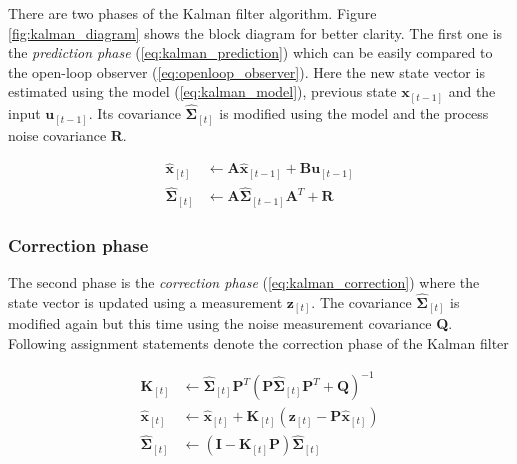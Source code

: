 There are two phases of the Kalman filter algorithm. Figure \ref{fig:kalman_diagram} shows the block diagram for better clarity. The first one is the \textit{prediction phase} (\ref{eq:kalman_prediction}) which can be easily compared to the open-loop observer (\ref{eq:openloop_observer}). Here the new state vector is estimated using the model (\ref{eq:kalman_model}), previous state $\textbf{\^x}_{[t-1]}$ and the input $\textbf{u}_{[t-1]}$. Its covariance $\hat{\boldsymbol{\Sigma}}_{[t]}$ is modified using the model and the process noise covariance $\textbf{R}$.

\begin{equation}
\begin{split}
\hat{\textbf{x}}_{[t]} &\leftarrow \textbf{A}\hat{\textbf{x}}_{[t-1]} + \textbf{B}\textbf{u}_{[t-1]} \\
\hat{\boldsymbol{\Sigma}}_{[t]} &\leftarrow \textbf{A}\hat{\boldsymbol{\Sigma}}_{[t-1]}\textbf{A}^{T} + \textbf{R}
\end{split}
\label{eq:kalman_prediction}
\end{equation}    

\subsubsection{Correction phase}
The second phase is the \textit{correction phase} (\ref{eq:kalman_correction}) where the state vector is updated using a measurement $\textbf{z}_{[t]}$. The covariance $\hat{\boldsymbol{\Sigma}}_{[t]}$ is modified again but this time using the noise measurement covariance \textbf{Q}. Following assignment statements denote the correction phase of the Kalman filter

\begin{equation}
\begin{split}
\textbf{K}_{[t]} &\leftarrow \hat{\boldsymbol{\Sigma}}_{[t]}\textbf{P}^{T}\left(\textbf{P}\hat{\boldsymbol{\Sigma}}_{[t]}\textbf{P}^{T} + \textbf{Q}\right)^{-1} \\
\hat{\textbf{x}}_{[t]} &\leftarrow \hat{\textbf{x}}_{[t]} + \textbf{K}_{[t]}\left(\textbf{z}_{[t]} - \textbf{P}\hat{\textbf{x}}_{[t]}\right) \\
\hat{\boldsymbol{\Sigma}}_{[t]} &\leftarrow \left(\mathbf{I} - \textbf{K}_{[t]}\textbf{P}\right)\hat{\boldsymbol{\Sigma}}_{[t]}
\end{split}
\label{eq:kalman_correction}
\end{equation}

